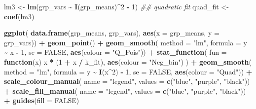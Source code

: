\documentclass[
  12pt,
]{book}
\newenvironment{Shaded}{\begin{snugshade}}{\end{snugshade}}
\newcommand{\CommentTok}[1]{\textcolor[rgb]{0.56,0.35,0.01}{\textit{#1}}}
\newcommand{\ControlFlowTok}[1]{\textcolor[rgb]{0.13,0.29,0.53}{\textbf{#1}}}
\newcommand{\DataTypeTok}[1]{\textcolor[rgb]{0.13,0.29,0.53}{#1}}
\newcommand{\DecValTok}[1]{\textcolor[rgb]{0.00,0.00,0.81}{#1}}
\newcommand{\KeywordTok}[1]{\textcolor[rgb]{0.13,0.29,0.53}{\textbf{#1}}}
\newcommand{\NormalTok}[1]{#1}
\newcommand{\OperatorTok}[1]{\textcolor[rgb]{0.81,0.36,0.00}{\textbf{#1}}}
\newcommand{\OtherTok}[1]{\textcolor[rgb]{0.56,0.35,0.01}{#1}}
\newcommand{\StringTok}[1]{\textcolor[rgb]{0.31,0.60,0.02}{#1}}
\begin{document}
\begin{Shaded}
\begin{Highlighting}[]
\NormalTok{lm3 \textless{}{-}}\StringTok{ }\KeywordTok{lm}\NormalTok{(grp\_vars }\OperatorTok{\textasciitilde{}}\StringTok{ }\KeywordTok{I}\NormalTok{(grp\_means)}\OperatorTok{\^{}}\DecValTok{2} \OperatorTok{{-}}\StringTok{ }\DecValTok{1}\NormalTok{) }\CommentTok{\#\# quadratic fit}
\NormalTok{quad\_fit \textless{}{-}}\StringTok{ }\KeywordTok{coef}\NormalTok{(lm3)}

\KeywordTok{ggplot}\NormalTok{(}
  \KeywordTok{data.frame}\NormalTok{(grp\_means, grp\_vars),}
  \KeywordTok{aes}\NormalTok{(}\DataTypeTok{x =}\NormalTok{ grp\_means, }\DataTypeTok{y =}\NormalTok{ grp\_vars)) }\OperatorTok{+}
\StringTok{  }\KeywordTok{geom\_point}\NormalTok{() }\OperatorTok{+}
\StringTok{  }\KeywordTok{geom\_smooth}\NormalTok{(}
    \DataTypeTok{method =} \StringTok{"lm"}\NormalTok{, }\DataTypeTok{formula =}\NormalTok{ y }\OperatorTok{\textasciitilde{}}\StringTok{ }\NormalTok{x }\OperatorTok{{-}}\StringTok{ }\DecValTok{1}\NormalTok{, }\DataTypeTok{se =} \OtherTok{FALSE}\NormalTok{,}
    \KeywordTok{aes}\NormalTok{(}\DataTypeTok{colour =} \StringTok{"Q\_Pois"}\NormalTok{)) }\OperatorTok{+}
\StringTok{  }\KeywordTok{stat\_function}\NormalTok{(}
    \DataTypeTok{fun =} \ControlFlowTok{function}\NormalTok{(x) x }\OperatorTok{*}\StringTok{ }\NormalTok{(}\DecValTok{1} \OperatorTok{+}\StringTok{ }\NormalTok{x }\OperatorTok{/}\StringTok{ }\NormalTok{k\_fit),}
    \KeywordTok{aes}\NormalTok{(}\DataTypeTok{colour =} \StringTok{"Neg\_bin"}\NormalTok{)}
\NormalTok{  ) }\OperatorTok{+}
\StringTok{  }\KeywordTok{geom\_smooth}\NormalTok{(}
    \DataTypeTok{method =} \StringTok{"lm"}\NormalTok{, }\DataTypeTok{formula =}\NormalTok{ y }\OperatorTok{\textasciitilde{}}\StringTok{ }\KeywordTok{I}\NormalTok{(x}\OperatorTok{\^{}}\DecValTok{2}\NormalTok{) }\OperatorTok{{-}}\StringTok{ }\DecValTok{1}\NormalTok{, }\DataTypeTok{se =} \OtherTok{FALSE}\NormalTok{,}
    \KeywordTok{aes}\NormalTok{(}\DataTypeTok{colour =} \StringTok{"Quad"}\NormalTok{)) }\OperatorTok{+}
\StringTok{  }\KeywordTok{scale\_colour\_manual}\NormalTok{(}
    \DataTypeTok{name =} \StringTok{"legend"}\NormalTok{,}
    \DataTypeTok{values =} \KeywordTok{c}\NormalTok{(}\StringTok{"blue"}\NormalTok{, }\StringTok{"purple"}\NormalTok{, }\StringTok{"black"}\NormalTok{)) }\OperatorTok{+}
\StringTok{  }\KeywordTok{scale\_fill\_manual}\NormalTok{(}
    \DataTypeTok{name =} \StringTok{"legend"}\NormalTok{,}
    \DataTypeTok{values =} \KeywordTok{c}\NormalTok{(}\StringTok{"blue"}\NormalTok{, }\StringTok{"purple"}\NormalTok{, }\StringTok{"black"}\NormalTok{)) }\OperatorTok{+}
\StringTok{  }\KeywordTok{guides}\NormalTok{(}\DataTypeTok{fill =} \OtherTok{FALSE}\NormalTok{)}
\end{Highlighting}
\end{Shaded}
\end{document}
